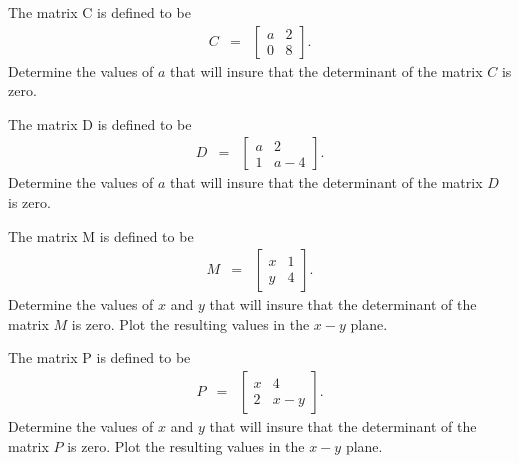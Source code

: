   \begin{problem}

  \item The matrix C is defined to be
    \begin{eqnarray}
      C & = & \left[
        \begin{array}{rr}
           a &  2\\
           0 &  8
        \end{array}
      \right].
    \end{eqnarray}
    Determine the values of $a$ that will insure that the determinant
    of the matrix $C$ is zero.

    \vfill

  \item The matrix D is defined to be
    \begin{eqnarray}
      D & = & \left[
        \begin{array}{rr}
           a &  2\\
           1 &  a-4
        \end{array}
      \right].
    \end{eqnarray}
    Determine the values of $a$ that will insure that the determinant
    of the matrix $D$ is zero.

    \vfill

    \clearpage

  \item The matrix M is defined to be
    \begin{eqnarray}
      M & = & \left[
        \begin{array}{rr}
           x &  1\\
           y &  4
        \end{array}
      \right].
    \end{eqnarray}
    Determine the values of $x$ and $y$ that will insure that the
    determinant of the matrix $M$ is zero. Plot the resulting values
    in the $x-y$ plane.

    \vfill

  \item The matrix P is defined to be
    \begin{eqnarray}
      P & = & \left[
        \begin{array}{rr}
           x &  4\\
           2 &  x-y
        \end{array}
      \right].
    \end{eqnarray}
    Determine the values of $x$ and $y$ that will insure that the
    determinant of the matrix $P$ is zero. Plot the resulting values
    in the $x-y$ plane.


\end{problem}
